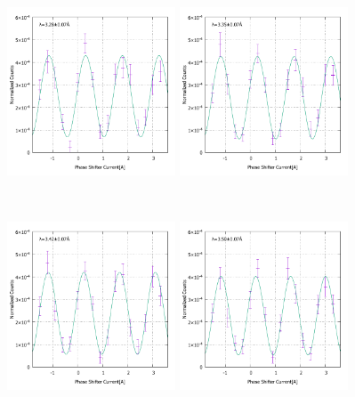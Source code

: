 \begin{figure}[h]
\begin{minipage}{0.33\hsize}
\end{minipage}
\begin{minipage}{0.33\hsize}
\includegraphics[width=5cm]{discussion/IF_nb/Interference_nb_fit460.pdf}
\end{minipage}
\begin{minipage}{0.33\hsize}
\includegraphics[width=5cm]{discussion/IF_nb/Interference_nb_fit470.pdf}
\end{minipage}\\
\begin{minipage}{0.33\hsize}
\includegraphics[width=5cm]{discussion/IF_nb/Interference_nb_fit480.pdf}
\end{minipage}
\begin{minipage}{0.33\hsize}
\includegraphics[width=5cm]{discussion/IF_nb/Interference_nb_fit490.pdf}

\end{minipage}
\end{figure}
